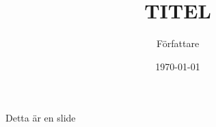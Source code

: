 \documentclass{beamer}
\title{TITEL}
\author{Författare}
\date{\today}
\begin{document}
\begin{frame}
    \titlepage
\end{frame}


\begin{frame}
    \tableofcontents
\end{frame}

\begin{frame}{Detta är en slide}
    
\end{frame}
\end{document}
